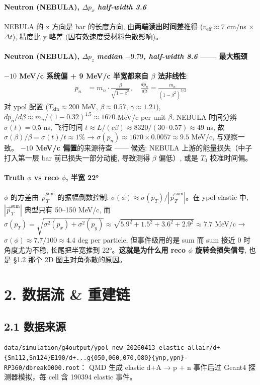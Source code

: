 \documentclass[a4paper,11pt]{article}
\begin{document}
\paragraph{Neutron (NEBULA), $\Delta p_x$ \textit{half-width 3.6}}
NEBULA 的 x 方向是 bar 的长度方向, 由\textbf{两端读出时间差}推得 ($v_\text{eff} \approx 7$ cm/ns × $\Delta t$), 精度比 y 略差 (因有效速度受材料色散影响)。

\paragraph{Neutron (NEBULA), $\Delta p_z$ \textit{median $-9.79$, half-width 8.6} —— 最大瓶颈}
\textbf{$-10$ MeV/c 系统偏 + 9 MeV/c 半宽都来自 $\beta$ 法非线性}:
\begin{align}
p_n &= m_n \cdot \frac{\beta}{\sqrt{1-\beta^2}}, \quad \frac{dp_n}{d\beta} = \frac{m_n}{(1-\beta^2)^{3/2}}
\end{align}
对 ypol 配置 ($T_\text{kin} \approx 200$ MeV, $\beta \approx 0.57$, $\gamma \approx 1.21$), $dp_n/d\beta \approx m_n / (1-0.32)^{1.5} \approx 1670$ MeV/c per unit $\beta$. NEBULA 时间分辨 $\sigma(t) = 0.5$ ns, 飞行时间 $t \approx L/(c\beta) \approx 8320 / (30 \cdot 0.57) \approx 49$ ns, 故 $\sigma(\beta)/\beta = \sigma(t)/t \approx 1\%$ → $\sigma(p_n) \approx 1670 \times 0.0057 \approx 9.5$ MeV/c, 与观察一致。
\textbf{$-10$ MeV/c 偏置}的来源待查 —— 候选: NEBULA 上游的能量损失（中子打入第一层 bar 前已损失一部分动能, 导致测得 $\beta$ 偏低）, 或是 $T_0$ 校准时间偏。

\paragraph{Truth $\phi$ vs reco $\phi$, 半宽 22°}
$\phi$ 的方差由 $\vec p_T^\text{sum}$ 的振幅倒数控制: $\sigma(\phi) \approx \sigma(p_T) / |\vec p_T^\text{sum}|$。在 ypol elastic 中, $|\vec p_T^\text{sum}|$ 典型只有 50--150 MeV/c, 而 $\sigma(p_T) = \sqrt{\sigma^2(p_x) + \sigma^2(p_y)} \approx \sqrt{5.9^2 + 1.5^2 + 3.6^2 + 2.9^2} \approx 7.7$ MeV/c → $\sigma(\phi) \approx 7.7/100 \approx 4.4$ deg per particle, 但事件级用的是 sum 而 sum 接近 0 时角度尤为不稳, 长尾把半宽推到 22°。\textbf{这就是为什么用 reco $\phi$ 旋转会损失信号}, 也是 §1.2 那个 2D 图主对角弥散的原因。

\section{2. 数据流 \& 重建链}

\subsection*{2.1 数据来源}
\texttt{data/simulation/g4output/ypol\_new\_20260413\_elastic\_allair/d+\{Sn112,Sn124\}E190/d+...g\{050,060,070,080\}\{ynp,ypn\}-RP360/dbreak0000.root}：
QMD 生成 elastic d+A → p + n 事件后过 Geant4 探测器模拟，每 cell 含 190394 elastic 事件。
\end{document}

